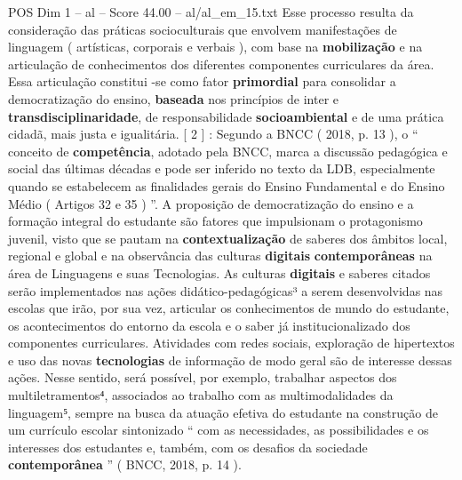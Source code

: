 \begin{textsample}{POS Dim 1 – al – Score 44.00 – al/al\_em\_15.txt}
Esse processo resulta da consideração das práticas socioculturais que envolvem manifestações de linguagem ( artísticas, corporais e verbais ), com base na \textbf{mobilização} e na articulação de conhecimentos dos diferentes componentes curriculares da área.
Essa articulação constitui -se como fator \textbf{primordial} para consolidar a democratização do ensino, \textbf{baseada} nos princípios de inter e \textbf{transdisciplinaridade}, de responsabilidade \textbf{socioambiental} e de uma prática cidadã, mais justa e igualitária. [ 2 ] : Segundo a BNCC ( 2018, p. 13 ), o “ conceito de \textbf{competência}, adotado pela BNCC, marca a discussão pedagógica e social das últimas décadas e pode ser inferido no texto da LDB, especialmente quando se estabelecem as finalidades gerais do Ensino Fundamental e do Ensino Médio ( Artigos 32 e 35 ) ”.
A proposição de democratização do ensino e a formação integral do estudante são fatores que impulsionam o protagonismo juvenil, visto que se pautam na \textbf{contextualização} de saberes dos âmbitos local, regional e global e na observância das culturas \textbf{digitais} \textbf{contemporâneas} na área de Linguagens e suas Tecnologias.
As culturas \textbf{digitais} e saberes citados serão implementados nas ações didático-pedagógicas³ a serem desenvolvidas nas escolas que irão, por sua vez, articular os conhecimentos de mundo do estudante, os acontecimentos do entorno da escola e o saber já institucionalizado dos componentes curriculares.
Atividades com redes sociais, exploração de hipertextos e uso das novas \textbf{tecnologias} de informação de modo geral são de interesse dessas ações.
Nesse sentido, será possível, por exemplo, trabalhar aspectos dos multiletramentos⁴, associados ao trabalho com as multimodalidades da linguagem⁵, sempre na busca da atuação efetiva do estudante na construção de um currículo escolar sintonizado “ com as necessidades, as possibilidades e os interesses dos estudantes e, também, com os desafios da sociedade \textbf{contemporânea} ” ( BNCC, 2018, p. 14 ).

\end{textsample}

